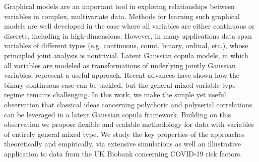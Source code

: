 
\noindent Graphical models are an important tool in exploring relationships between variables in complex, multivariate data. Methods for learning such graphical models are well developed in the case where all variables are either continuous or discrete, including in high-dimensions. However, in many applications data span variables of different types (e.g. continuous, count, binary, ordinal, etc.), whose principled joint analysis is nontrivial. Latent Gaussian copula models, in which all variables are modeled as transformations of underlying jointly Gaussian variables, represent a useful approach. Recent advances have shown how the binary-continuous case can be tackled, but the general mixed variable type regime remains challenging. In this work, we make the simple yet useful observation that classical ideas concerning polychoric and polyserial correlations can be leveraged in a latent Gaussian copula framework. Building on this observation we propose flexible and scalable methodology for data with variables of entirely general mixed type. We study the key properties of the approaches theoretically and empirically, via extensive simulations as well an illustrative application to data from the UK Biobank concerning COVID-19 risk factors.